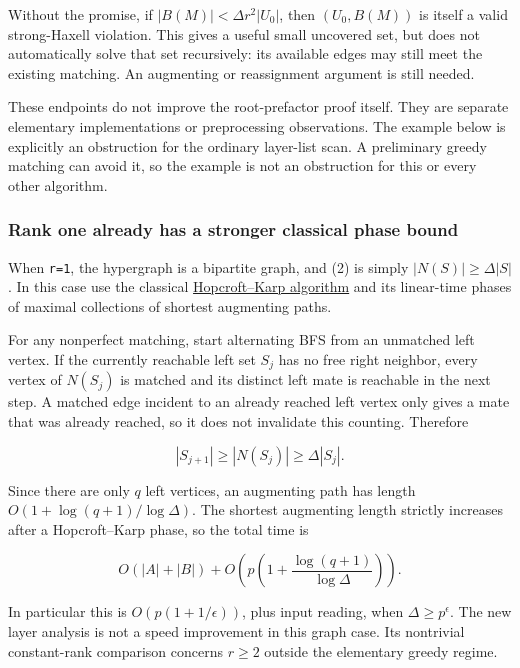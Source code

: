 Without the promise, if \(|B(M)|<\Delta r^2|U_0|\), then \((U_0,B(M))\) is itself a valid strong-Haxell violation. This gives a useful small uncovered set, but does not automatically solve that set recursively: its available edges may still meet the existing matching. An augmenting or reassignment argument is still needed.

These endpoints do not improve the root-prefactor proof itself. They are separate elementary implementations or preprocessing observations. The example below is explicitly an obstruction for the ordinary layer-list scan. A preliminary greedy matching can avoid it, so the example is not an obstruction for this or every other algorithm.

\hypertarget{af-6a8212874a-rank-one-already-has-a-stronger-classical-phase-bound}{%
\subsubsection{Rank one already has a stronger classical phase bound}\label{af-6a8212874a-rank-one-already-has-a-stronger-classical-phase-bound}}

When \texttt{r=1}, the hypergraph is a bipartite graph, and (2) is simply \(|N(S)|\ge\Delta|S|\). In this case use the classical \href{https://doi.org/10.1137/0202019}{Hopcroft--Karp algorithm} and its linear-time phases of maximal collections of shortest augmenting paths.

For any nonperfect matching, start alternating BFS from an unmatched left vertex. If the currently reachable left set \(S_j\) has no free right neighbor, every vertex of \(N(S_j)\) is matched and its distinct left mate is reachable in the next step. A matched edge incident to an already reached left vertex only gives a mate that was already reached, so it does not invalidate this counting. Therefore

\[
|S_{j+1}|\ge|N(S_j)|\ge\Delta|S_j|.
\]

Since there are only \(q\) left vertices, an augmenting path has length \(O(1+\log(q+1)/\log\Delta)\). The shortest augmenting length strictly increases after a Hopcroft--Karp phase, so the total time is

\[
O(|A|+|B|)+O\!\left(p\left(1+
                       \frac{\log(q+1)}{\log\Delta}\right)\right).
 \tag{14c}
\]

In particular this is \(O(p(1+1/\epsilon))\), plus input reading, when \(\Delta\ge p^\epsilon\). The new layer analysis is not a speed improvement in this graph case. Its nontrivial constant-rank comparison concerns \(r\ge2\) outside the elementary greedy regime.

